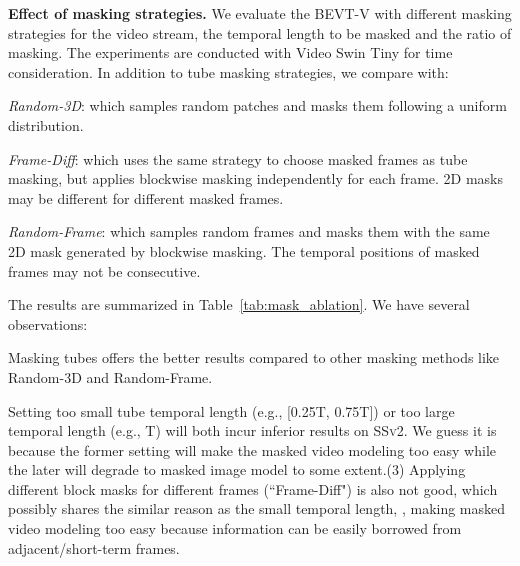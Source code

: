 \documentclass[10pt,twocolumn,letterpaper]{article}
\makeatletter
\newcommand*{\system}{BEVT\@\xspace}
\newcommand{\ssv}{{\scshape SSv2}\xspace}
\makeatother
\begin{document}
\vspace{0.05in}
\noindent\textbf{Effect of masking strategies.} We evaluate the \system-V with different masking strategies for the video stream, \ie the temporal length to be masked and the ratio of masking. The experiments are conducted with Video Swin Tiny for time consideration. In addition to tube masking strategies, we compare with:
\begin{enumerate*}[label=(\arabic*)]
    \item \emph{Random-3D}: which samples random patches and masks them following a uniform distribution.
    \item \emph{Frame-Diff}: which uses the same strategy to choose masked frames as tube masking, but applies blockwise masking independently for each frame. 2D masks may be different for different masked frames.
    \item \emph{Random-Frame}: which samples random frames and masks them with the same 2D mask generated by blockwise masking. The temporal positions of masked frames may not be consecutive.
\end{enumerate*}
The results are summarized in Table~\ref{tab:mask_ablation}. We have several observations: 
\begin{enumerate*}[label=(\arabic*)]
\item Masking tubes offers the better results compared to other masking methods like Random-3D and Random-Frame. 
\item Setting too small tube temporal length (e.g., [0.25T, 0.75T]) or too large temporal length (e.g., T) will both incur inferior results on \ssv. We guess it is because the former setting will make the masked video modeling too easy while the later will degrade to masked image model to some extent.(3) Applying different block masks for different frames (``Frame-Diff") is also not good, which possibly shares the similar reason as the small temporal length, \ie, making masked video modeling too easy because information can be easily borrowed from adjacent/short-term frames.
\end{enumerate*}
\end{document}
